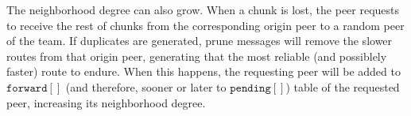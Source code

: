 The neighborhood degree can also grow. When a chunk is lost, the peer
requests to receive the rest of chunks from the corresponding origin
peer to a random peer of the team. If duplicates are generated, prune
messages will remove the slower routes from that origin peer,
generating that the most reliable (and possiblely faster) route to
endure. When this happens, the requesting peer will be added to
$\mathtt{forward}[]$ (and therefore, sooner or later to
$\mathtt{pending}[]$) table of the requested peer, increasing its
neighborhood degree.
